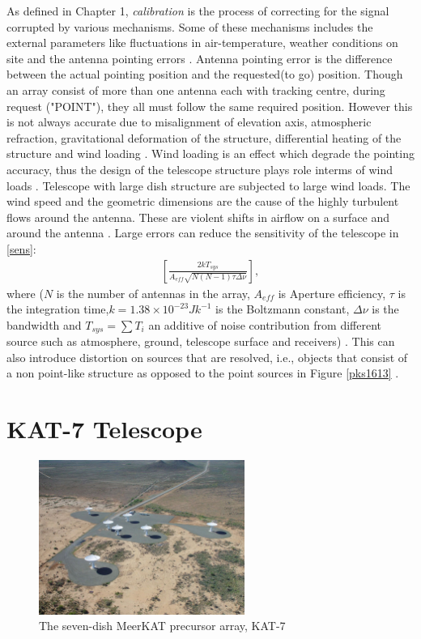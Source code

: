 As defined in Chapter 1, \textit{calibration} is the process of correcting for the signal corrupted by various mechanisms. Some of these mechanisms includes the external parameters like fluctuations in air-temperature, weather conditions on site and the antenna pointing errors \citep{taylor1999synthesis}. Antenna pointing error is the difference between the actual pointing position and the requested(to go) position. Though an array consist of more than one antenna each with tracking centre, during request ("POINT"),  they all must follow the same required position. However this is not always accurate due to misalignment of elevation axis, atmospheric refraction, gravitational deformation of the structure, differential heating of the structure and wind loading \citep{taylor1999synthesis}. Wind loading is an effect which degrade the pointing accuracy, thus the design of the telescope structure plays  role interms of wind loads \citep{smithdynamic}. Telescope with large dish structure are subjected to large wind loads. The wind speed and the geometric dimensions are the cause of the highly turbulent flows around the antenna. These are violent shifts in airflow on a surface and around the antenna \citep{upnere2012characterization}. Large errors can reduce the sensitivity of the telescope in \ref{sens}:
\begin{align}
\left[\frac{2kT_{sys}}{A_{eff}\sqrt{N(N-1)\tau \Delta \nu}}\right]
\label{sens},
\end{align}
 where ($N$ is the number of antennas in the array,  $A_{eff}$ is Aperture efficiency, $\tau$ is the integration time,$k=1.38\times 10^{-23}Jk^{-1}$ is the Boltzmann constant, $\Delta \nu$ is the bandwidth and $T_{sys}=\sum T_{i}$ an additive of noise contribution from different source such as atmosphere, ground, telescope surface and receivers) \citep{wilson2013tools}. This can also introduce distortion on sources that are resolved, i.e., objects that consist of a non point-like structure as opposed to the point sources in Figure \ref{pks1613} \citep{Calibration}. 



\section{KAT-7 Telescope}
\label{kat7}

\begin{figure}[H]
  \centering
    \includegraphics[width=0.6\textwidth]{images/K7.png}
    \caption{The seven-dish MeerKAT precursor array, KAT-7 \citep{carignan2013kat}}
  \label{images/kat7.png}
\end{figure}

